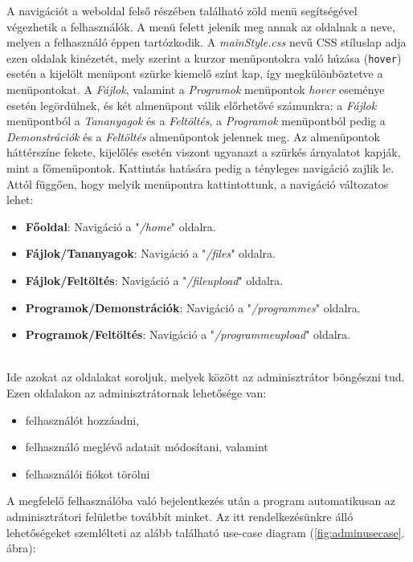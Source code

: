 A navigációt a weboldal felső részében található zöld menü segítségével végezhetik a felhasználók. A menü felett jelenik meg annak az oldalnak a neve, melyen a felhasználó éppen tartózkodik. A \textit{mainStyle.css} nevű CSS stíluslap adja ezen oldalak kinézetét, mely szerint a kurzor menüpontokra való húzása (\texttt{hover}) esetén a kijelölt menüpont szürke kiemelő színt kap, így megkülönböztetve a menüpontokat. A \textit{Fájlok}, valamint a \textit{Programok} menüpontok \textit{hover} eseménye esetén legördülnek, és két almenüpont válik előrhetővé számunkra: a \textit{Fájlok} menüpontból a \textit{Tananyagok} és a \textit{Feltöltés}, a \textit{Programok} menüpontból pedig a \textit{Demonstrációk} és a \textit{Feltöltés} almenüpontok jelennek meg. Az almenüpontok háttérszíne fekete, kijelőlés esetén viszont ugyanazt a szürkés árnyalatot kapják, mint a főmenüpontok. Kattintás hatására pedig a tényleges navigáció zajlik le. Attól függően, hogy melyik menüpontra kattintottunk, a navigáció változatos lehet:

\begin{itemize}
\item{\textbf{Főoldal}: Navigáció a "\textit{/home}" oldalra.}
\item{\textbf{Fájlok/Tananyagok}: Navigáció a "\textit{/files}" oldalra.}
\item{\textbf{Fájlok/Feltöltés}: Navigáció a "\textit{/fileupload}" oldalra.}
\item{\textbf{Programok/Demonstrációk}: Navigáció a "\textit{/programmes}" oldalra.}
\item{\textbf{Programok/Feltöltés}: Navigáció a "\textit{/programmeupload}" oldalra.}
\end{itemize}

\\

Ide azokat az oldalakat soroljuk, melyek között az adminisztrátor böngészni tud. Ezen oldalakon az adminisztrátornak lehetősége van:

\begin{itemize}
\item{felhasználót hozzáadni,}
\item{felhasználó meglévő adatait módosítani, valamint}
\item{felhasználói fiókot törölni}
\end{itemize}

A megfelelő felhasználóba való bejelentkezés után a program automatikusan az adminisztrátori felületbe továbbít minket. Az itt rendelkezésünkre álló lehetőségeket szemlélteti az alább található use-case diagram (\ref{fig:adminusecase}. ábra):

